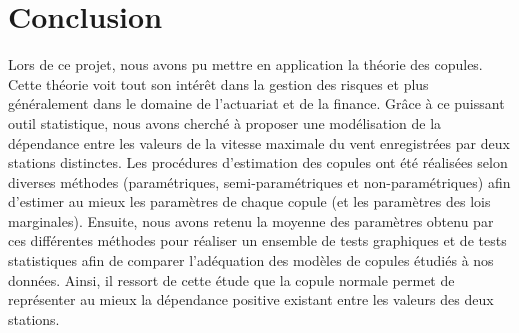 \section*{Conclusion}

Lors de ce projet, nous avons pu mettre en application la théorie des copules. Cette théorie voit tout son intérêt dans la gestion des risques et plus généralement dans le domaine de l'actuariat et de la finance. Grâce à ce puissant outil statistique, nous avons cherché à proposer une modélisation de la dépendance entre les valeurs de la vitesse maximale du vent enregistrées par deux stations distinctes. Les procédures d'estimation des copules ont été réalisées selon diverses méthodes (paramétriques, semi-paramétriques et non-paramétriques) afin d'estimer au mieux les paramètres de chaque copule (et les paramètres des lois marginales). Ensuite, nous avons retenu la moyenne des paramètres obtenu par ces différentes méthodes pour réaliser un ensemble de tests graphiques et de tests statistiques afin de comparer l'adéquation des modèles de copules étudiés à nos données. Ainsi, il ressort de cette étude que la copule normale permet de représenter au mieux la dépendance positive existant entre les valeurs des deux stations.



